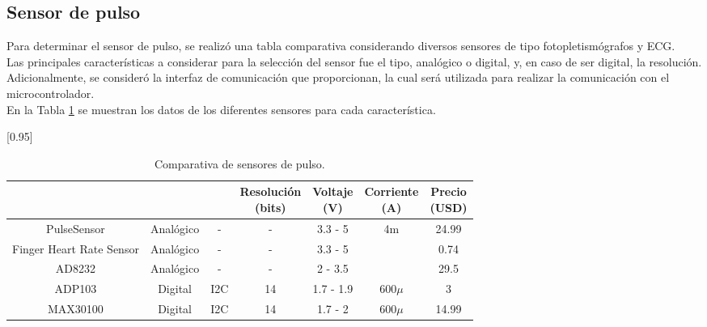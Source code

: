 
\subsection{Sensor de pulso}
Para determinar el sensor de pulso, se realizó una tabla comparativa considerando diversos sensores de tipo fotopletismógrafos y ECG. \\

Las principales características a considerar para la selección del sensor fue el tipo, analógico o digital, y, en caso de ser digital, la resolución. Adicionalmente, se consideró la interfaz de comunicación que proporcionan, la cual será utilizada para realizar la comunicación con el microcontrolador.\\

En la Tabla \ref{analisis:sensorPulso} se muestran los datos de los diferentes sensores para cada característica.



\begin{table}[htbp]
	\begin{center}
		\scalebox{0.95}[0.95]{
		\begin{tabular}{|c|c|c|c|c|c|c|}
			\hline
			\thead{Modelo}&\thead{Tipo}&\thead{Interfaz}&\thead{Resolución \\ (bits)}&\thead{Voltaje \\ (V)}& \thead{Corriente \\ (A)}&\thead{Precio\\ (USD)}\\
			\hline
			\hline
			PulseSensor & Analógico&-&-& 3.3 - 5&4m&24.99 \\
			\hline
			Finger Heart Rate Sensor & Analógico& -&- & 3.3 - 5&&0.74 \\
			\hline
			AD8232 & Analógico& -& - & 2 - 3.5&&29.5 \\
			\hline
			ADP103 & Digital& I2C& 14 & 1.7 - 1.9&$600\mu$&3 \\
			\hline
			MAX30100 & Digital& I2C &14 & 1.7 - 2&$600\mu$&14.99 \\
			\hline
		\end{tabular}}
		\caption{Comparativa de sensores de pulso.}
		\label{analisis:sensorPulso}
	\end{center}
\end{table}


\pagebreak